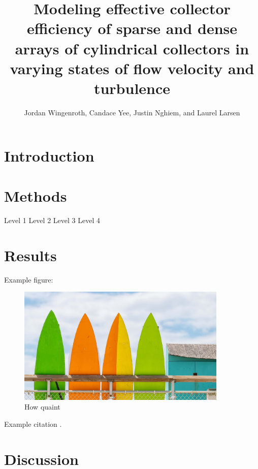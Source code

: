\documentclass[10pt,a4paper]{article}
\author{Jordan Wingenroth, Candace Yee, Justin Nghiem, and Laurel Larsen}
\title{Modeling effective collector efficiency of sparse and dense arrays of cylindrical collectors in varying states of flow velocity and turbulence}
\begin{document}
\maketitle

\section{Introduction}



\section{Methods}

\begin{outline}
   \1 Level 1 
      \2 Level 2
         \3 Level 3
            \4 Level 4      

\end{outline}

\section{Results}

Example figure:

\begin{figure}[h]
\includegraphics[width=10cm]{example.jpg}
\centering
\caption{How quaint}
\end{figure}

Example citation \citep{Fauria_2015}.

\section{Discussion}



\end{document}
